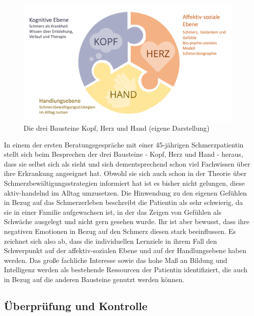 \documentclass[
  twoside,
  parskip=half-,
  paper=176mm:246mm,
  BCOR=14mm,
  DIV=14,
]{scrreprt}
\begin{document}
 \begin{figure}
  \centering
  \includegraphics[width=\textwidth]{Grafiken/KopfHerzHand.pdf}
  \caption{Die drei Bausteine Kopf, Herz und Hand (eigene Darstellung)}
  \label{fig:bausteine}
\end{figure}

\pagebreak

\begin{beispiel}
  In einem der ersten Beratungsgespräche mit einer 45-jährigen Schmerzpatientin stellt sich beim Besprechen der drei Bausteine - Kopf, Herz und Hand - heraus, dass sie selbst sich als  sieht und sich dementsprechend schon viel Fachwissen über ihre Erkrankung angeeignet hat. Obwohl sie sich auch schon in der Theorie über Schmerzbewältigungsstrategien informiert hat ist es bisher nicht gelungen, diese aktiv-handelnd im Alltag umzusetzen. Die Hinwendung zu den eigenen Gefühlen in Bezug auf das Schmerzerleben beschreibt die Patientin als sehr schwierig, da sie in einer Familie aufgewachsen ist, in der das Zeigen von Gefühlen als Schwäche ausgelegt und nicht gern gesehen wurde. Ihr ist aber bewusst, dass ihre negativen Emotionen in Bezug auf den Schmerz diesen stark beeinflussen. Es zeichnet sich also ab, dass die individuellen Lernziele in ihrem Fall den Schwerpunkt auf der affektiv-sozialen Ebene und auf der Handlungsebene haben werden. Das große fachliche Interesse sowie das hohe Maß an Bildung und Intelligenz werden als bestehende Ressourcen der Patientin identifiziert, die auch in Bezug auf die anderen Bausteine genutzt werden können. 
\end{beispiel}

\subsection{Überprüfung und Kontrolle}
\end{document}

